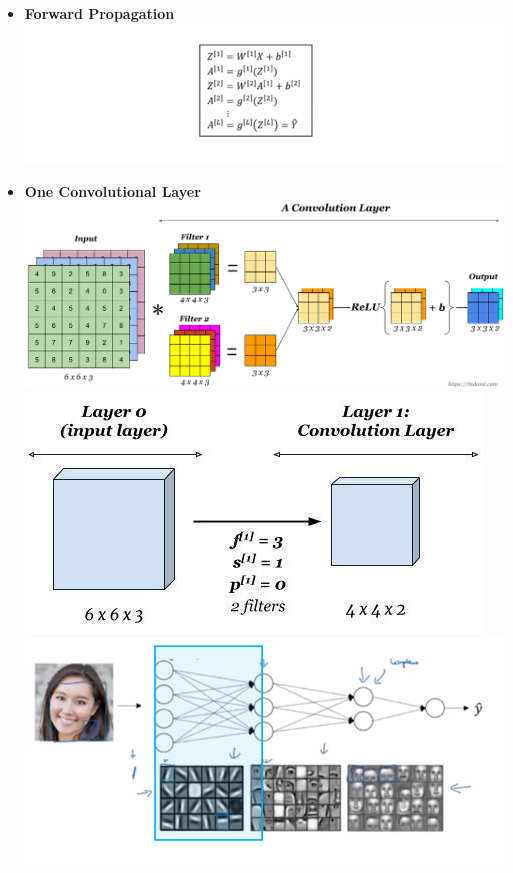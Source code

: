 \documentclass[11pt]{article}
\makeatletter
\def\maxwidth{\ifdim\Gin@nat@width>\linewidth\linewidth
    \else\Gin@nat@width\fi}
\let\Oldincludegraphics\includegraphics
\renewcommand{\includegraphics}[1]{\Oldincludegraphics[width=.8\maxwidth]{#1}}
\makeatother
\begin{document}
\begin{itemize}
\item
  \textbf{Forward Propagation}\\
  \includegraphics{./Images/c4week1/14-5-2.png}\\
\item
  \textbf{One Convolutional Layer}\\
   \includegraphics{./Images/c4week1/14-6.png}\\
   \includegraphics{./Images/c4week1/15.png}
  \includegraphics{./Images/c4week1/15-2.png} 

\end{itemize}
\end{document}
